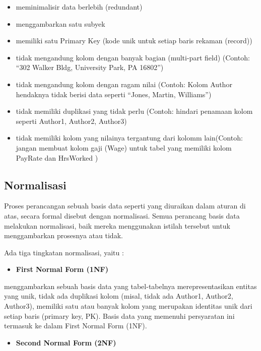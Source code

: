 \documentclass[]{book}
\providecommand{\tightlist}{%
  \setlength{\itemsep}{0pt}\setlength{\parskip}{0pt}}
\begin{document}
\begin{itemize}
\tightlist
\item
  meminimalisir data berlebih (redundant)
\item
  menggambarkan satu subyek
\item
  memiliki satu Primary Key (kode unik untuk setiap baris rekaman (record))
\item
  tidak mengandung kolom dengan banyak bagian (multi-part field) (Contoh: ``302 Walker Bldg, University Park, PA 16802'')
\item
  tidak mengandung kolom dengan ragam nilai (Contoh: Kolom Author hendaknya tidak berisi data seperti ``Jones, Martin, Williams'')
\item
  tidak memiliki duplikasi yang tidak perlu (Contoh: hindari penamaan kolom seperti Author1, Author2, Author3)
\item
  tidak memiliki kolom yang nilainya tergantung dari kolomm lain(Contoh: jangan membuat kolom gaji (Wage) untuk tabel yang memiliki kolom PayRate dan HrsWorked )
\end{itemize}

\hypertarget{normalisasi}{%
\subsection{Normalisasi}\label{normalisasi}}

Proses perancangan sebuah basis data seperti yang diuraikan dalam aturan di atas, secara formal disebut dengan normalisasi. Semua perancang basis data melakukan normalisasi, baik mereka menggunakan istilah tersebut untuk menggambarkan prosesnya atau tidak.

Ada tiga tingkatan normalisasi, yaitu :

\begin{itemize}
\tightlist
\item
  \textbf{First Normal Form (1NF)}
\end{itemize}

menggambarkan sebuah basis data yang tabel-tabelnya merepresentasikan entitas yang unik, tidak ada duplikasi kolom (misal, tidak ada Author1, Author2, Author3), memiliki satu atau banyak kolom yang merupakan identitas unik dari setiap baris (primary key, PK). Basis data yang memenuhi persyaratan ini termasuk ke dalam First Normal Form (1NF).

\begin{itemize}
\tightlist
\item
  \textbf{Second Normal Form (2NF)}
\end{itemize}
\end{document}
